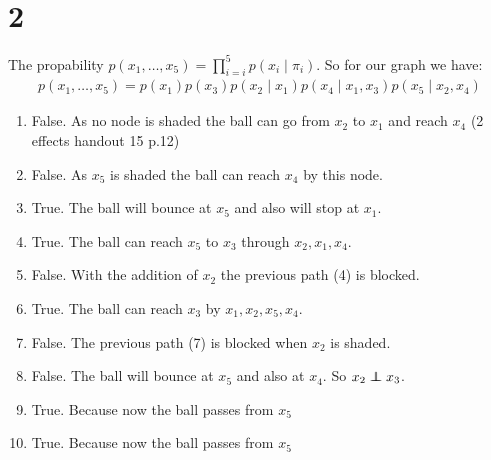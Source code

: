 \section*{2}
The propability $p(x_1,\dotsc,x_5) = \prod_{i=i}^5 p(x_i\mid \pi_i)$.
So for our graph we have:
\begin{align*}
p(x_1,\dotsc,x_5) = p(x_1)p(x_3)p(x_2\mid x_1)p(x_4\mid x_{1},x_3)p(x_5\mid x_{2},x_4)
\end{align*}
\begin{enumerate}
\item False. As no node is shaded the ball can go from $x_2$ to $x_1$ and reach $x_4$ (2 effects handout 15 p.12)
\item False. As $x_5$ is shaded the ball can reach $x_4$ by this node.
\item True. The ball will bounce at $x_5$ and also will stop at $x_1$.
\item True. The ball can reach $x_5$ to $x_3$ through $x_2, x_1, x_4$.
\item False. With the addition of $x_2$ the previous path (4) is blocked.
\item True. The ball can reach $x_3$ by $x_1, x_2, x_5, x_4$.
\item False. The previous path (7) is blocked when $x_2$ is shaded.
\item False. The ball will bounce at $x_5$ and also at $x_4$. So $x_2 \independent x_3$. 
\item True. Because now the ball passes from $x_5$
\item True. Because now the ball passes from $x_5$
\end{enumerate}
